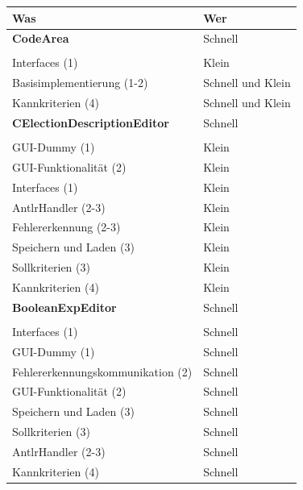 \documentclass[a4paper]{scrreprt}
\begin{document}
\begin{tabular}{ | p{7cm} | p{7cm} |}
    \hline
	Was & Wer\\
	\hline
	
	\rule{0pt}{15pt}\textbf {CodeArea} & Schnell\\
	&\\
	\hline
	Interfaces (1) & Klein\\
	\hline
	Basisimplementierung (1-2) & Schnell und Klein\\
	\hline
	Kannkriterien (4) & Schnell und Klein \\
	\hline
	
	\rule{0pt}{15pt}\textbf {CElectionDescriptionEditor} & Schnell\\
	&\\
	\hline
	GUI-Dummy (1) & Klein \\
	\hline
	GUI-Funktionalität (2) & Klein\\
	\hline
	Interfaces (1) & Klein\\
	\hline
	AntlrHandler (2-3) & Klein\\
	\hline
	Fehlererkennung (2-3) & Klein\\
	\hline
	Speichern und Laden (3) & Klein\\
	\hline
	Sollkriterien (3) & Klein\\
	\hline
	Kannkriterien (4) & Klein\\
	\hline
	
	\rule{0pt}{15pt}\textbf {BooleanExpEditor} &  Schnell \\
	&\\
	\hline
	Interfaces (1) & Schnell\\
	\hline
	GUI-Dummy (1) & Schnell\\
	\hline
	Fehlererkennungskommunikation (2) & Schnell\\
	\hline
	GUI-Funktionalität (2) & Schnell\\
	\hline
	Speichern und Laden (3) & Schnell\\
	\hline	
	Sollkriterien (3) & Schnell\\
	\hline
	AntlrHandler (2-3) & Schnell\\
	\hline
	Kannkriterien (4) & Schnell\\
	\hline
	

\end{tabular}
\end{document}
